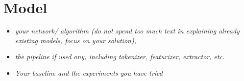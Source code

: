 \section{Model}
\begin{itemize}
    \item \textit{your network/ algorithm (do not spend too much text in explaining already existing models, focus on your solution),}
    \item \textit{the pipeline if used any, including  tokenizer, featurizer, extractor, etc.}
    \item \textit{Your baseline and the experiments you have tried}
\end{itemize}
 
